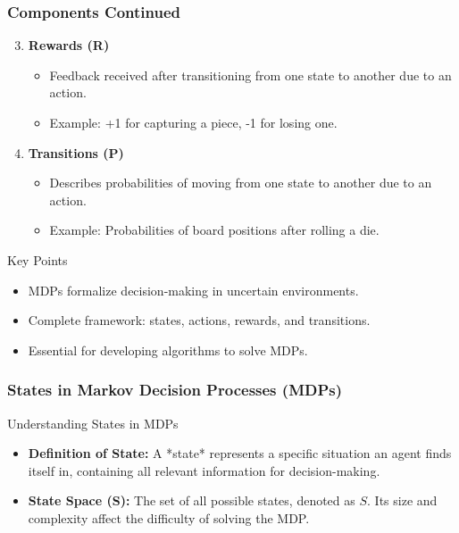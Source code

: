\documentclass[aspectratio=169]{beamer}
\begin{document}
\begin{frame}[fragile]
    \frametitle{Components Continued}
    \begin{enumerate}
        \setcounter{enumi}{2}
        \item \textbf{Rewards (R)}
        \begin{itemize}
            \item Feedback received after transitioning from one state to another due to an action.
            \item Example: +1 for capturing a piece, -1 for losing one.
        \end{itemize}

        \item \textbf{Transitions (P)}
        \begin{itemize}
            \item Describes probabilities of moving from one state to another due to an action.
            \item Example: Probabilities of board positions after rolling a die.
        \end{itemize}
    \end{enumerate}

    \begin{block}{Key Points}
        \begin{itemize}
            \item MDPs formalize decision-making in uncertain environments.
            \item Complete framework: states, actions, rewards, and transitions.
            \item Essential for developing algorithms to solve MDPs.
        \end{itemize}
    \end{block}
\end{frame}

\begin{frame}[fragile]
    \frametitle{States in Markov Decision Processes (MDPs)}
    \begin{block}{Understanding States in MDPs}
        \begin{itemize}
            \item \textbf{Definition of State:} A *state* represents a specific situation an agent finds itself in, containing all relevant information for decision-making.
            \item \textbf{State Space (S):} The set of all possible states, denoted as \( S \). Its size and complexity affect the difficulty of solving the MDP.
        \end{itemize}
    \end{block}
\end{frame}
\end{document}
